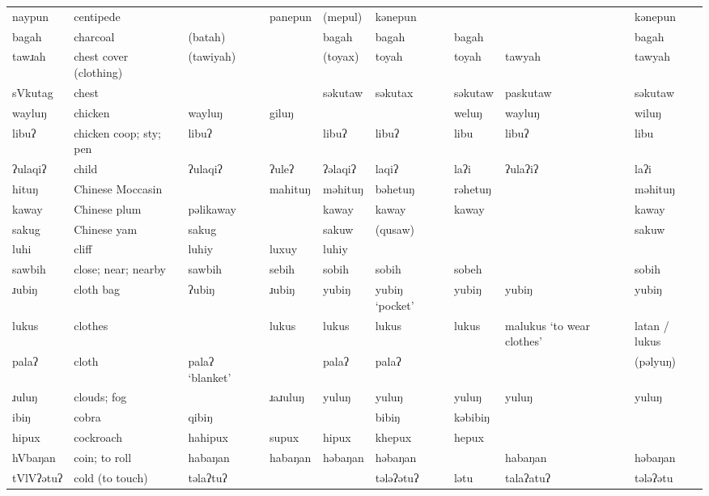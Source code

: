 \begin{landscape}
\begin{longtable}{*{9}{>{\raggedright\arraybackslash}p{}}}
\text{*}naypun      & centipede &  & panepun & (mepul) & kənepun &  &  & kənepun\\
\text{*}bagah        & charcoal & (batah) &  & bagah & bagah & bagah &  & bagah\\
\text{*}tawɹah       & chest cover (clothing) & (tawiyah) &  & (toyax) & toyah & toyah & tawyah & tawyah\\
\text{*}sVkutag      & chest &  &  & səkutaw & səkutax & səkutaw & paskutaw & səkutaw\\
\text{*}wayluŋ       & chicken & wayluŋ & giluŋ &  &  & weluŋ & wayluŋ & wiluŋ\\
\text{*}libuʔ        & chicken coop; sty; pen & libuʔ &  & libuʔ & libuʔ & libu & libuʔ & libu\\
\text{*}ʔulaqiʔ      & child & ʔulaqiʔ & ʔuleʔ & ʔəlaqiʔ & laqiʔ & laʔi & ʔulaʔiʔ & laʔi\\
\text{*}hituŋ       & Chinese Moccasin &  & mahituŋ & məhituŋ & bəhetuŋ & rəhetuŋ &  & məhituŋ\\
\text{*}kaway        & Chinese plum & pəlikaway &  & kaway & kaway & kaway &  & kaway\\
\text{*}sakug        & Chinese yam & sakug &  & sakuw & (qusaw) &  &  & sakuw\\
\text{*}luhi         & cliff & luhiy & luxuy & luhiy &  &  &  & \\
\text{*}sawbih       & close; near; nearby & sawbih & sebih & sobih & sobih & sobeh &  & sobih\\
\text{*}ɹubiŋ        & cloth bag & ʔubiŋ & ɹubiŋ & yubiŋ & yubiŋ `pocket' & yubiŋ & yubiŋ & yubiŋ\\
\text{*}lukus        & clothes &  & lukus & lukus & lukus & lukus & malukus `to wear clothes' & latan / lukus\\
\text{*}palaʔ        & cloth & palaʔ \newline `blanket' &  & palaʔ & palaʔ &  &  & (pəlyuŋ)\\
\text{*}ɹuluŋ        & clouds; fog &  & ɹaɹuluŋ & yuluŋ & yuluŋ & yuluŋ & yuluŋ & yuluŋ\\
\text{*}ibiŋ        & cobra & qibiŋ &  &  & bibiŋ & kəbibiŋ &  & \\
\text{*}hipux        & cockroach & hahipux & supux & hipux & khepux & hepux &  & \\
\text{*}hVbaŋan      & coin; to roll & habaŋan & habaŋan & həbaŋan & həbaŋan &  & habaŋan & həbaŋan\\
\text{*}tVlVʔətuʔ    & cold (to touch) & təlaʔtuʔ &  &  & tələʔətuʔ & lətu & talaʔatuʔ & tələʔətu\\

\end{longtable}
\end{landscape}

